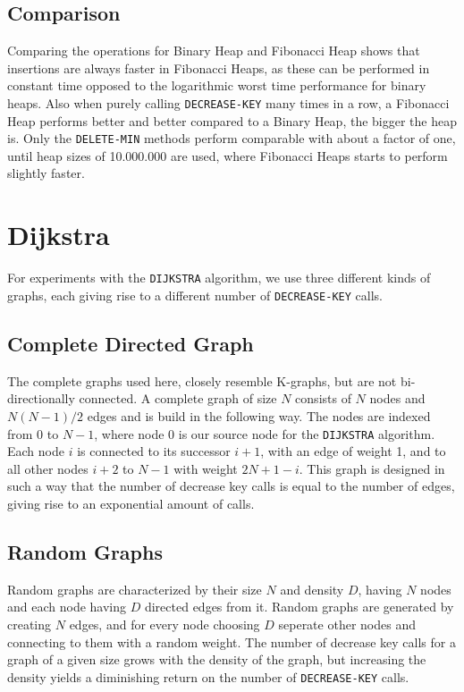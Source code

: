 \documentclass[a4paper,10pt]{article}
\begin{document}
\subsection{Comparison}
Comparing the operations for Binary Heap and Fibonacci Heap shows that insertions are always faster in Fibonacci Heaps, as these can be performed in constant time opposed to the logarithmic worst time performance for binary heaps. Also when purely calling \texttt{DECREASE\--KEY} many times in a row, a Fibonacci Heap performs better and better compared to a Binary Heap, the bigger the heap is. Only the \texttt{DELETE\--MIN} methods perform comparable with about a factor of one, until heap sizes of 10.000.000 are used, where Fibonacci Heaps starts to perform slightly faster.

\section{Dijkstra}
For experiments with the \texttt{DIJKSTRA} algorithm, we use three different kinds of graphs, each giving rise to a different number of \texttt{DECREASE\--KEY} calls.
\subsection{Complete Directed Graph}
The complete graphs used here, closely resemble K-graphs, but are not bi-directionally connected. A complete graph of size $N$ consists of $N$ nodes and $N(N-1)/2$ edges and is build in the following way. The nodes are indexed from 0 to $N-1$, where node 0 is our source node for the \texttt{DIJKSTRA} algorithm. Each node $i$ is connected to its successor $i+1$, with an edge of weight 1, and to all other nodes $i+2$ to $N-1$ with weight $2N+1-i$. This graph is designed in such a way that the number of decrease key calls is equal to the number of edges, giving rise to an exponential amount of calls.

\subsection{Random Graphs}
Random graphs are characterized by their size $N$ and density $D$, having $N$ nodes and each node having $D$ directed edges from it. Random graphs are generated by creating $N$ edges, and for every node choosing $D$ seperate other nodes and connecting to them with a random weight. The number of decrease key calls for a graph of a given size grows with the density of the graph, but increasing the density yields a diminishing return on the number of \texttt{DECREASE\--KEY} calls. 
\end{document}
